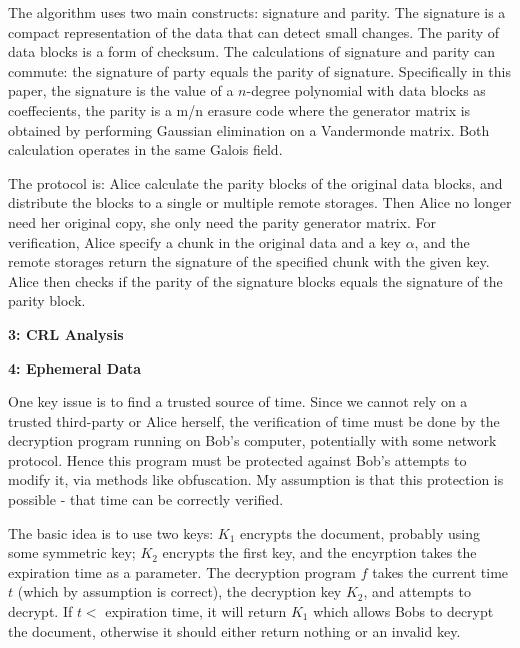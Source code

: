\documentclass[10pt]{article}
\newcommand\question[2]{\vspace{.1in}\textbf{#1: #2}\vspace{.5em}\vspace{.10in}}
\begin{document}
The algorithm uses two main constructs: signature and parity. The signature is a
compact representation of the data that can detect small changes. The parity of
data blocks is a form of checksum. The calculations of signature and parity can
commute: the signature of party equals the parity of signature. Specifically in
this paper, the signature is the value of a $n$-degree polynomial with data
blocks as coeffecients, the parity is a m/n erasure code where the generator
matrix is obtained by performing Gaussian elimination on a Vandermonde matrix.
Both calculation operates in the same Galois field.

The protocol is: Alice calculate the parity blocks of the original data blocks,
and distribute the blocks to a single or multiple remote storages. Then Alice no
longer need her original copy, she only need the parity generator matrix. For
verification, Alice specify a chunk in the original data and a key $\alpha$, and
the remote storages return the signature of the specified chunk with the given
key. Alice then checks if the parity of the signature blocks equals the
signature of the parity block.


\newpage
\question{3}{CRL Analysis}

\newpage
\question{4}{Ephemeral Data}

One key issue is to find a trusted source of time. Since we cannot rely on a
trusted third-party or Alice herself, the verification of time must be done by
the decryption program running on Bob's computer, potentially with some network
protocol. Hence this program must be protected against Bob's attempts to modify
it, via methods like obfuscation. My assumption is that this protection is
possible - that time can be correctly verified.

The basic idea is to use two keys: $K_1$ encrypts the document, probably
using some symmetric key; $K_2$ encrypts the first key, and the encyrption takes
the expiration time as a parameter. The decryption program $f$ takes the current
time $t$ (which by assumption is correct), the decryption key $K_2$, and
attempts to decrypt. If $t<$ expiration time, it will return $K_1$ which allows
Bobs to decrypt the document, otherwise it should either return nothing or an
invalid key.
\end{document}
